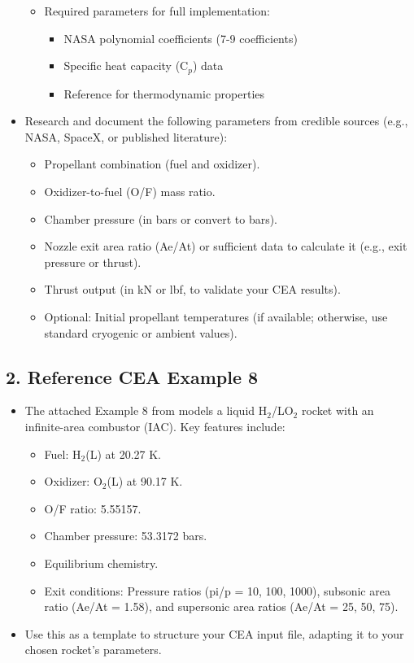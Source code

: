 \documentclass[12pt]{article}
\begin{document}
\begin{itemize}
\begin{itemize}
        \item Required parameters for full implementation:
        \begin{itemize}
            \item NASA polynomial coefficients (7-9 coefficients)
            \item Specific heat capacity (C$_p$) data
            \item Reference for thermodynamic properties
        \end{itemize}
    \end{itemize}
    
    \item Research and document the following parameters from credible sources (e.g., NASA, SpaceX, or published literature):
    \begin{itemize}
        \item Propellant combination (fuel and oxidizer).
        \item Oxidizer-to-fuel (O/F) mass ratio.
        \item Chamber pressure (in bars or convert to bars).
        \item Nozzle exit area ratio (Ae/At) or sufficient data to calculate it (e.g., exit pressure or thrust).
        \item Thrust output (in kN or lbf, to validate your CEA results).
        \item Optional: Initial propellant temperatures (if available; otherwise, use standard cryogenic or ambient values).
    \end{itemize}
\end{itemize}

\subsection{2. Reference CEA Example 8}
\begin{itemize}
    \item The attached Example 8 from \cite{cea_example} models a liquid H$_2$/LO$_2$ rocket with an infinite-area combustor (IAC). Key features include:
    \begin{itemize}
        \item Fuel: H$_2$(L) at 20.27 K.
        \item Oxidizer: O$_2$(L) at 90.17 K.
        \item O/F ratio: 5.55157.
        \item Chamber pressure: 53.3172 bars.
        \item Equilibrium chemistry.
        \item Exit conditions: Pressure ratios (pi/p = 10, 100, 1000), subsonic area ratio (Ae/At = 1.58), and supersonic area ratios (Ae/At = 25, 50, 75).
    \end{itemize}
    \item Use this as a template to structure your CEA input file, adapting it to your chosen rocket's parameters.
\end{itemize}
\end{document}

